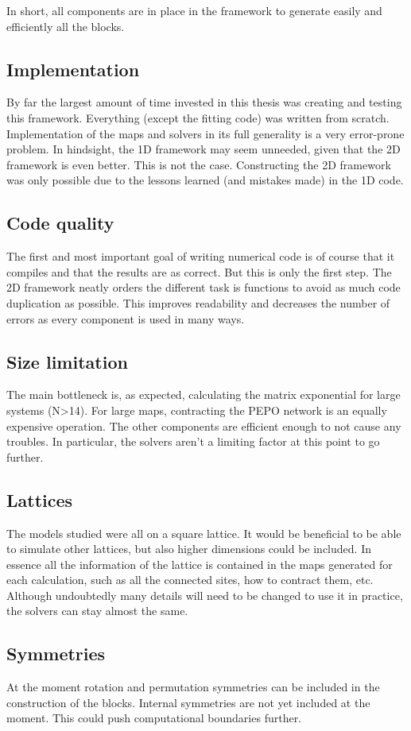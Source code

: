 
In short, all components are in place in the framework to generate easily and efficiently all the blocks.

\subsection{Implementation}

By far the largest amount of time invested in this thesis was creating and testing this framework. Everything (except the fitting code) was written from scratch. Implementation of the maps and solvers in its full generality is a very error-prone problem. In hindsight, the 1D framework may seem unneeded, given that the 2D framework is even better. This is not the case. Constructing the 2D framework was only possible due to the lessons learned (and mistakes made) in the 1D code.

\subsection*{Code quality}
The first and most important goal of writing numerical code is of course that it compiles and that the results are as correct. But this is only the first step. The 2D framework neatly orders the different task is functions to avoid as much code duplication as possible. This improves readability and decreases the number of errors as every component is used in many ways.

\subsection*{Size limitation}
The main bottleneck is, as expected, calculating the matrix exponential for large systems (N>14). For large maps, contracting the PEPO network is an equally expensive operation. The other components are efficient enough to not cause any troubles. In particular, the solvers aren't a limiting factor at this point to go further.

\subsection*{Lattices}
The models studied were all on a square lattice. It would be beneficial to be able to simulate other lattices, but also higher dimensions could be included. In essence all the information of the lattice is contained in the maps generated for each calculation, such as all the connected sites, how to contract them, etc. Although undoubtedly many details will need to be changed to use it in practice, the solvers can stay almost the same.

\subsection*{Symmetries}

At the moment rotation and permutation symmetries can be included in the construction of the blocks. Internal symmetries are not yet included at the moment. This could push computational boundaries further.
